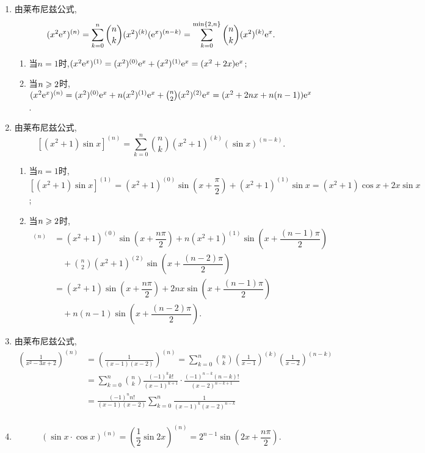 \begin{solution}
    \begin{enumerate}
        \item 由莱布尼兹公式,$$(x^2 \mathrm{e}^x)^{(n)} = \sum_{k=0}^n \binom{n}{k} (x^2)^{(k)} (\mathrm{e}^x)^{(n-k)} = \sum_{k=0}^{\min\{2,n\}} \binom{n}{k} (x^2)^{(k)} \mathrm{e}^x.$$
              \begin{enumerate}
                  \item 当$n=1$时,$(x^2 \mathrm{e}^x)^{(1)} = (x^2)^{(0)} \mathrm{e}^x + (x^2)^{(1)} \mathrm{e}^x = (x^2 + 2x) \mathrm{e}^x$;
                  \item 当$n \geqslant 2$时,$(x^2 \mathrm{e}^x)^{(n)} = (x^2)^{(0)} \mathrm{e}^x + n (x^2)^{(1)} \mathrm{e}^x + \binom{n}{2} (x^2)^{(2)} \mathrm{e}^x = (x^2 + 2nx + n(n-1)) \mathrm{e}^x$.
              \end{enumerate}
        \item 由莱布尼兹公式,$$[(x^2+1) \sin x]^{(n)} = \sum_{k=0}^n \binom{n}{k} (x^2+1)^{(k)} (\sin x)^{(n-k)} .$$
              \begin{enumerate}
                  \item 当$n=1$时,$[(x^2+1) \sin x]^{(1)} = (x^2+1)^{(0)} \sin(x + \dfrac{\pi}2) + (x^2+1)^{(1)} \sin x = (x^2+1) \cos x + 2x \sin x$;
                  \item 当$n \geqslant 2$时,
                        \begin{align*}
                            [(x^2+1) \sin x]^{(n)} &= (x^2+1)^{(0)} \sin(x + \dfrac{n\pi}2) + n (x^2+1)^{(1)} \sin(x + \dfrac{(n-1)\pi}2) \\
                            & \quad + \binom{n}{2} (x^2+1)^{(2)} \sin(x + \dfrac{(n-2)\pi}2) \\
                                                  & = (x^2+1) \sin(x + \dfrac{n\pi}2) + 2nx \sin(x + \dfrac{(n-1)\pi}2) \\
                                                  &\quad + n(n-1) \sin(x + \dfrac{(n-2)\pi}2).
                        \end{align*}
              \end{enumerate}
              \item 由莱布尼兹公式,
              \begin{align*}
                \left( \frac{1}{x^2 - 3x + 2} \right)^{(n)} &= \left( \frac{1}{(x-1)(x-2)} \right)^{(n)} = \sum_{k=0}^n \binom{n}{k} \left( \frac{1}{x-1} \right)^{(k)} \left( \frac{1}{x-2} \right)^{(n-k)} \\
                &= \sum_{k=0}^n \binom{n}{k} \frac{(-1)^k k!}{(x-1)^{k+1}} \cdot \frac{(-1)^{n-k} (n-k)!}{(x-2)^{n-k+1}} \\
                &= \frac{(-1)^n n!}{(x-1)(x-2)} \sum_{k=0}^n \frac{1}{(x-1)^k (x-2)^{n-k}} \\
              \end{align*}
              \item $$(\sin x \cdot \cos x)^{(n)} =\left( \frac12 \sin 2x \right)^{(n)} = 2^{n-1} \sin \left( 2x + \dfrac{n\pi}2 \right).$$
    \end{enumerate}
\end{solution}

